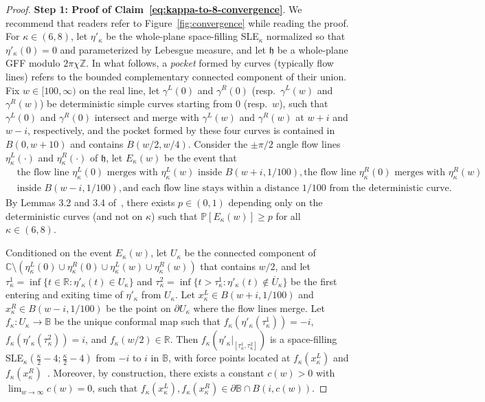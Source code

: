 \documentclass[a4paper]{article}
\numberwithin{equation}{section}
\numberwithin{equation}{section}
\renewcommand{\1}{\mathbf{1}}
\begin{document}
\begin{proof}
    \textbf{Step 1: Proof of Claim~\eqref{eq:kappa-to-8-convergence}}. We recommend that readers refer to Figure~\ref{fig:convergence} while reading the proof. For $\kappa \in (6,8)$, let $\eta'_\kappa$ be the whole-plane space-filling SLE$_\kappa$ normalized so that $\eta'_\kappa(0)=0$ and parameterized by Lebesgue measure, and let $\mathfrak h$ be a whole-plane GFF modulo $2\pi\chi \mathbb Z$. In what follows, a \emph{pocket} formed by curves (typically flow lines) refers to the bounded complementary connected component of their union. Fix $w \in [100,\infty)$ on the real line, let $\gamma^L(0)$ and $\gamma^R(0)$ (resp.\ $\gamma^L(w)$ and $\gamma^R(w)$) be deterministic simple curves starting from 0 (resp.\ $w$), such that $\gamma^L(0)$ and $\gamma^R(0)$ intersect and merge with $\gamma^L(w)$ and $\gamma^R(w)$ at $w+i$ and $w-i$, respectively, and the pocket formed by these four curves is contained in $B(0,w+10)$ and contains $B(w/2,w/4)$. Consider the $\pm \pi/2$ angle flow lines $\eta_\kappa^L(\cdot)$ and $\eta_\kappa^R(\cdot)$ of $\mathfrak h$, let $E_\kappa(w)$ be the event that
   \begin{align*}
       &\mbox{the flow line } \eta_\kappa^L(0) \mbox{ merges with } \eta_\kappa^L(w) \mbox{ inside } B(w+i,1/100), \mbox{the flow line } \eta_\kappa^R(0) \mbox{ merges with } \eta_\kappa^R(w) \\
       &\mbox{inside } B(w-i,1/100), \mbox{and each flow line stays within a distance } 1/100 \mbox{ from the deterministic curve.}
   \end{align*}
   By Lemmas 3.2 and 3.4 of~\cite{AM-SLE8}, there exists $p \in (0,1)$ depending only on the deterministic curves (and not on $\kappa$) such that $\mathbb P[E_\kappa(w)] \ge p$ for all $\kappa \in (6,8)$.
    
    Conditioned on the event $E_\kappa(w)$, let $U_\kappa$ be the connected component of $\mathbb C \setminus (\eta_\kappa^L(0) \cup \eta_\kappa^R(0) \cup \eta_\kappa^L(w) \cup \eta_\kappa^R(w))$ that contains $w/2$, and let $\tau_\kappa^1=\inf\{t \in \mathbb R: \eta'_\kappa(t) \in U_\kappa\}$ and $\tau_\kappa^2=\inf\{t>\tau_\kappa^1: \eta'_\kappa(t) \notin \overline U_\kappa\}$ be the first entering and exiting time of $\eta'_\kappa$ from $U_\kappa$. Let $x_\kappa^L \in B(w+i,1/100) $ and $x_\kappa^R \in B(w-i,1/100)$ be the point on $\partial U_\kappa$ where the flow lines merge. Let $f_\kappa:U_\kappa \to \mathbb B$ be the unique conformal map such that $f_\kappa(\eta'_\kappa(\tau_\kappa^1))=-i$, $f_\kappa(\eta'_\kappa(\tau_\kappa^2))=i$, and $f_\kappa(w/2) \in \mathbb R$. Then $f_\kappa(\eta'_\kappa|_{[\tau_\kappa^1,\tau_\kappa^2]})$ is a space-filling SLE$_\kappa(\frac{\kappa}{2}-4;\frac{\kappa}{2}-4)$ from $-i$ to $i$ in $\mathbb B$, with force points located at $f_\kappa(x_\kappa^L)$ and $f_\kappa(x_\kappa^R)$~\cite{IG4}. Moreover, by construction, there exists a constant $c(w)>0$ with $\lim_{w \to \infty} c(w)=0$, such that $f_\kappa(x_\kappa^L),f_\kappa(x_\kappa^R) \in \partial \mathbb B \cap B(i,c(w))$.


\end{proof}
\end{document}
